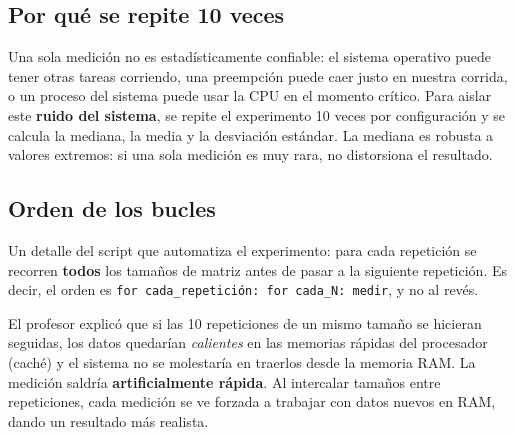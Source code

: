 \subsection{Por qué se repite 10 veces}

Una sola medición no es estadísticamente confiable: el sistema operativo puede tener otras tareas corriendo, una preempción puede caer justo en nuestra corrida, o un proceso del sistema puede usar la CPU en el momento crítico. Para aislar este \textbf{ruido del sistema}, se repite el experimento 10 veces por configuración y se calcula la mediana, la media y la desviación estándar. La mediana es robusta a valores extremos: si una sola medición es muy rara, no distorsiona el resultado.

\subsection{Orden de los bucles}

Un detalle del script que automatiza el experimento: para cada repetición se recorren \textbf{todos} los tamaños de matriz antes de pasar a la siguiente repetición. Es decir, el orden es \texttt{for cada\_repetición: for cada\_N: medir}, y no al revés.

El profesor explicó que si las 10 repeticiones de un mismo tamaño se hicieran seguidas, los datos quedarían \textit{calientes} en las memorias rápidas del procesador (caché) y el sistema no se molestaría en traerlos desde la memoria RAM. La medición saldría \textbf{artificialmente rápida}. Al intercalar tamaños entre repeticiones, cada medición se ve forzada a trabajar con datos nuevos en RAM, dando un resultado más realista.